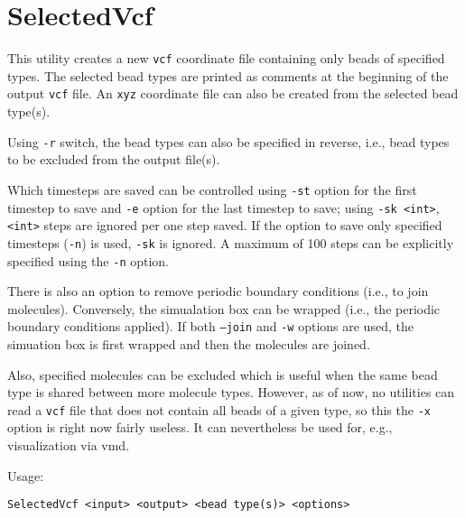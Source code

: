 \section{SelectedVcf} \label{sec:SelectedVcf}

This utility creates a new \texttt{vcf} coordinate file containing only
beads of specified types. The selected bead
types are printed as comments at the beginning of the output \texttt{vcf}
file.
An \texttt{xyz} coordinate file can also be created from the selected
bead type(s).

Using \texttt{-r} switch, the bead types can also be specified in reverse,
i.e., bead types to be excluded from the output file(s).

Which timesteps are saved can be controlled using \texttt{-st} option for
the first timestep to save and \texttt{-e} option for the last timestep to
save; using \texttt{-sk <int>}, \texttt{<int>} steps are ignored per one
step saved. If the option to save only specified timesteps (\texttt{-n}) is
used, \texttt{-sk} is ignored. A maximum of 100 steps can be explicitly
specified using the \texttt{-n} option.

There is also an option to remove periodic boundary conditions (i.e., to join
molecules). Conversely, the simualation box can be wrapped (i.e., the
periodic boundary conditions applied). If both \texttt{--join} and
\texttt{-w} options are used, the simuation box is first wrapped and then
the molecules are joined.

Also, specified molecules can be excluded which is useful when the same
bead type is shared between more molecule types. However, as of now, no
utilities can read a \texttt{vcf} file that does not contain all beads of a
given type, so this the \texttt{-x} option is right now fairly useless. It
can nevertheless be used for, e.g., visualization via vmd.

Usage:

\vspace{1em}
\noindent
\texttt{SelectedVcf <input> <output> <bead type(s)> <options>}

